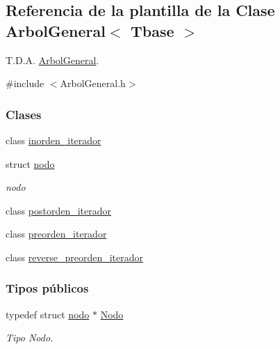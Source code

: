\hypertarget{classArbolGeneral}{\subsection{Referencia de la plantilla de la Clase Arbol\-General$<$ Tbase $>$}
\label{classArbolGeneral}
}


T.\-D.\-A. \hyperlink{classArbolGeneral}{Arbol\-General}.  




{\ttfamily \#include $<$Arbol\-General.\-h$>$}

\subsubsection*{Clases}
\begin{DoxyCompactItemize}
\item 
class \hyperlink{classArbolGeneral_1_1inorden__iterador}{inorden\-\_\-iterador}
\item 
struct \hyperlink{structArbolGeneral_1_1nodo}{nodo}
\begin{DoxyCompactList}\small\item\em nodo \end{DoxyCompactList}\item 
class \hyperlink{classArbolGeneral_1_1postorden__iterador}{postorden\-\_\-iterador}
\item 
class \hyperlink{classArbolGeneral_1_1preorden__iterador}{preorden\-\_\-iterador}
\item 
class \hyperlink{classArbolGeneral_1_1reverse__preorden__iterador}{reverse\-\_\-preorden\-\_\-iterador}
\end{DoxyCompactItemize}
\subsubsection*{Tipos públicos}
\begin{DoxyCompactItemize}
\item 
typedef struct \hyperlink{structArbolGeneral_1_1nodo}{nodo} $\ast$ \hyperlink{classArbolGeneral_a12cc1b74a9095d89bc7334290d332f7a}{Nodo}
\begin{DoxyCompactList}\small\item\em Tipo Nodo. \end{DoxyCompactList}\end{DoxyCompactItemize}
